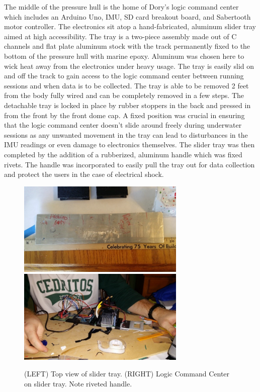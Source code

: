 \documentclass{report}
\begin{document}
The middle of the pressure hull is the home of Dory’s logic command center which includes an Arduino Uno, IMU, SD card breakout board, and Sabertooth motor controller.  The electronics sit atop a hand-fabricated, aluminum slider tray aimed at high accessibility.  The tray is a two-piece assembly made out of C channels and flat plate aluminum stock with the track permanently fixed to the bottom of the pressure hull with marine epoxy.  Aluminum was chosen here to wick heat away from the electronics under heavy usage.  The tray is easily slid on and off the track to gain access to the logic command center between running sessions and when data is to be collected.  The tray is able to be removed 2 feet from the body fully wired and can be completely removed in a few steps.  The detachable tray is locked in place by rubber stoppers in the back and pressed in from the front by the front dome cap.  A fixed position was crucial in ensuring that the logic command center doesn’t slide around freely during underwater sessions as any unwanted movement in the tray can lead to disturbances in the IMU readings or even damage to electronics themselves.  The slider tray was then completed by the addition of a rubberized, aluminum handle which was fixed rivets.  The handle was incorporated to easily pull the tray out for data collection and protect the users in the case of electrical shock.
\begin{figure}[H]
\centering
\includegraphics[width=8cm]{"tray"}
\includegraphics[width=8cm]{"brains"}
\caption{(LEFT) Top view of slider tray. (RIGHT) Logic Command Center on slider tray. Note riveted handle.}
\end{figure} 
\end{document}
